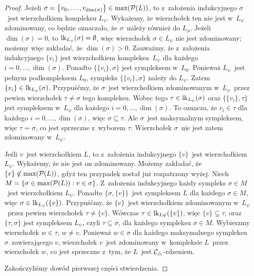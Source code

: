 \begin{proof}
Jeżeli $\sigma=\bigl\{v_0,\ldots,v_{\dim(\sigma)}\bigr\}\in \max(\mathcal{P}(L))$, to z~założenia indukcyjnego $\sigma$~jest wierzchołkiem kompleksu $L_\psi$. Wykażemy, że wierzchołek ten nie jest w~$L_\psi$ zdominowany, co będzie oznaczało, że $\sigma$~należy również do $L_\phi$. Jeżeli $\dim(\sigma)=0$, to $\operatorname{lk}_{L_\psi}(\sigma)=\emptyset$, więc wierzchołek $\sigma\in L_\psi$ nie jest zdominowany; możemy więc zakładać, że $\dim(\sigma)>0$. Zauważmy, że z~założenia indukcyjnego $\{v_i\}$ jest wierzchołkiem kompleksu~$L_\psi$ dla każdego $i=0,\ldots,\dim(\sigma)$. Ponadto $\{\{v_i\},\sigma\}$ jest sympleksem w~$L_0$. Ponieważ $L_\psi$~jest pełnym podkompleksem $L_0$, sympleks $\{\{v_i\},\sigma\}$ należy do $L_\psi$. Zatem $\{v_i\}\in \operatorname{lk}_{L_\psi}(\sigma)$. Przypuśćmy, że $\sigma$~jest wierzchołkiem zdominowanym w~$L_\psi$~przez pewien wierzchołek $\tau\not=\sigma$ tego kompleksu. Wobec tego $\tau\in\operatorname{lk}_{L_\psi}(\sigma)$ oraz $\{\{v_i\},\tau\}$ jest sympleksem w~$L_\psi$ dla każdego $i=0,\ldots,\dim(\sigma)$. To oznacza, że $v_i\in \tau$ dla każdego $i=0,\ldots,\dim(\sigma)$, więc $\sigma\subseteq \tau$. Ale $\sigma$~jest maksymalnym sympleksem, więc $\tau=\sigma$, co jest sprzeczne z~wyborem $\tau$. Wierzchołek $\sigma$~nie jest zatem zdominowany w~$L_\psi$.

Jeśli $v$~jest wierzchołkiem $L$, to z~założenia indukcyjnego $\{v\}$~jest wierzchołkiem $L_\psi$. Wykażemy, że nie jest on zdominowany. Możemy zakładać, że $\{v\}\not\in\max(\mathcal{P}(L))$, gdyż ten przypadek został już rozpatrzony wyżej. Niech $M=\{\sigma\in\max(\mathcal{P}(L)):v\in\sigma\}$. Z~założenia indukcyjnego każdy sympleks $\sigma\in M$~jest wierzchołkiem $L_\psi$. Ponadto $\{\sigma,\{v\}\}$~jest sympleksem $L$ dla każdego $\sigma\in M$, więc $\sigma\in \operatorname{lk}_{L_\psi}(\{v\})$. Przypuśćmy, że $\{v\}$~jest wierzchołkiem zdominowanym w~$L_\psi$~przez pewien wierzchołek $\tau\not=\{v\}$. Wówczas $\tau\in\operatorname{lk}_{L\psi}(\{v\})$, więc $\{v\}\subsetneq \tau$, oraz $\{\tau,\sigma\}$ jest sympleksem $L_\psi$, czyli $\tau\subseteq \sigma$, dla każdego sympleksu $\sigma\in M$. Wybierzmy wierzchołek $w\in \tau$, $w\not=v$. Ponieważ $w\in \sigma$ dla każdego maksymalnego sympleksu $\sigma$~zawierającego $v$, wierzchołek $v$~jest zdominowany w~kompleksie $L$~przez wierzchołek $w$, co jest sprzeczne z~tym, że $L$~jest $\mathcal{C}_\triangle$-rdzeniem.

Zakończyliśmy dowód pierwszej części stwierdzenia.


\end{proof}
